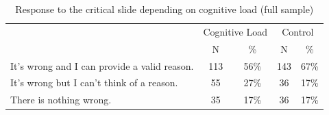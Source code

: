 \documentclass[
  american,
  man,floatsintext]{apa7}
\begin{document}
\begin{table}[tbp]

\begin{center}
\begin{threeparttable}

\caption{\label{tab:tabS6tab1dumb1all}Response to the critical slide depending on cognitive load (full sample)}

\begin{tabular}{lcccc}
\toprule
 & \multicolumn{2}{c}{Cognitive Load} & \multicolumn{2}{c}{Control} \\
\cmidrule(r){2-3} \cmidrule(r){4-5}
 & \multicolumn{1}{c}{N} & \multicolumn{1}{c}{\%} & \multicolumn{1}{c}{N} & \multicolumn{1}{c}{\%}\\
\midrule
It's wrong and I can provide a valid reason. & 113 & 56\% & 143 & 67\%\\
It's wrong but I can't think of a reason. & 55 & 27\% & 36 & 17\%\\
There is nothing wrong. & 35 & 17\% & 36 & 17\%\\
\bottomrule
\end{tabular}

\end{threeparttable}
\end{center}

\end{table}
\end{document}

